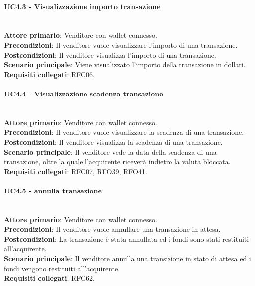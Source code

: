 \documentclass[a4paper, 12pt]{article}
\begin{document}
\paragraph{UC4.3 - Visualizzazione importo transazione}\\
\textbf{Attore primario}: Venditore con wallet connesso.\\
\textbf{Precondizioni}: Il venditore vuole visualizzare l'importo di una transazione.\\
\textbf{Postcondizioni}: Il venditore visualizza l'importo di una transazione.\\
\textbf{Scenario principale}: Viene visualizzato l'importo della transazione in dollari.\\
\textbf{Requisiti collegati}: RFO06.

\paragraph{UC4.4 - Visualizzazione scadenza transazione}\\
\textbf{Attore primario}: Venditore  con wallet connesso.\\
\textbf{Precondizioni}: Il venditore vuole visualizzare la scadenza di una transazione.\\
\textbf{Postcondizioni}: Il venditore visualizza la scadenza di una transazione.\\
\textbf{Scenario principale}: Il venditore vede la data della scadenza di una transazione, oltre la quale l'acquirente riceverà indietro la valuta bloccata.\\
\textbf{Requisiti collegati}: RFO07, RFO39, RFO41.

\paragraph{UC4.5 - annulla transazione}\\
\textbf{Attore primario}: Venditore  con wallet connesso.\\
\textbf{Precondizioni}: Il venditore vuole annullare una transazione in attesa.\\
\textbf{Postcondizioni}: La transazione è stata annullata ed i fondi sono stati restituiti all'acquirente.\\
\textbf{Scenario principale}: Il venditore annulla una transizione in stato di attesa ed i fondi vengono restituiti all'acquirente.\\
\textbf{Requisiti collegati}: RFO62.
\end{document}
